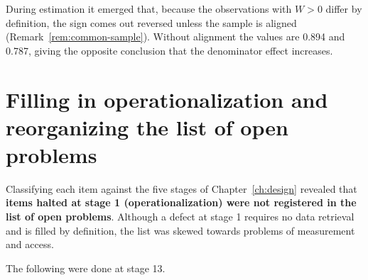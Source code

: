 During estimation it emerged that, because the observations with $W>0$ differ by definition, the
sign comes out reversed unless the sample is aligned (Remark~\ref{rem:common-sample}). Without
alignment the values are 0.894 and 0.787, giving the opposite conclusion that the denominator
effect increases.

\section{Filling in operationalization and reorganizing the list of open problems}

Classifying each item against the five stages of Chapter~\ref{ch:design} revealed that
\textbf{items halted at stage 1 (operationalization) were not registered in the list of open
problems}. Although a defect at stage 1 requires no data retrieval and is filled by definition, the
list was skewed towards problems of measurement and access.

The following were done at stage 13.

